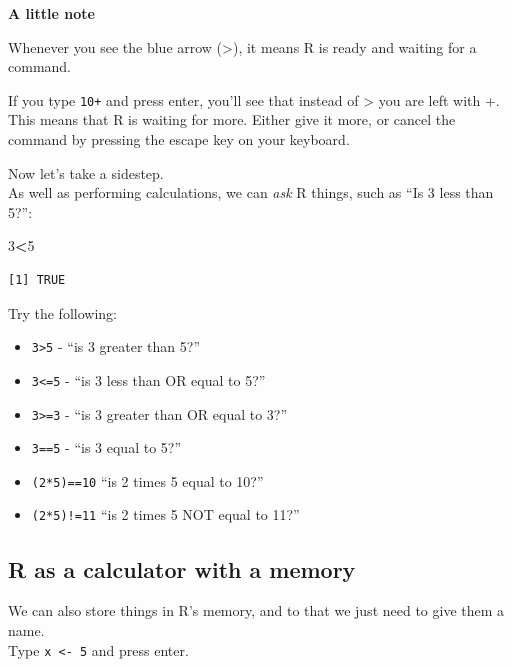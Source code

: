 \documentclass[]{book}
\newenvironment{Shaded}{\begin{snugshade}}{\end{snugshade}}
\newcommand{\DecValTok}[1]{\textcolor[rgb]{0.00,0.00,0.81}{#1}}
\newcommand{\OperatorTok}[1]{\textcolor[rgb]{0.81,0.36,0.00}{\textbf{#1}}}
\providecommand{\tightlist}{%
  \setlength{\itemsep}{0pt}\setlength{\parskip}{0pt}}
\begin{document}
\textbf{A little note}

Whenever you see the blue arrow ({\textgreater{}}), it means R is ready and waiting for a command.

If you type \texttt{10+} and press enter, you'll see that instead of {\textgreater{}} you are left with {+}. This means that R is waiting for more. Either give it more, or cancel the command by pressing the escape key on your keyboard.

Now let's take a sidestep.\\
As well as performing calculations, we can \emph{ask} R things, such as ``Is 3 less than 5?'':

\begin{Shaded}
\begin{Highlighting}[]
\DecValTok{3}\OperatorTok{<}\DecValTok{5}
\end{Highlighting}
\end{Shaded}

\begin{verbatim}
[1] TRUE
\end{verbatim}

Try the following:

\begin{itemize}
\tightlist
\item
  \texttt{3\textgreater{}5} - ``is 3 greater than 5?''
\item
  \texttt{3\textless{}=5} - ``is 3 less than OR equal to 5?''
\item
  \texttt{3\textgreater{}=3} - ``is 3 greater than OR equal to 3?''
\item
  \texttt{3==5} - ``is 3 equal to 5?''
\item
  \texttt{(2*5)==10} ``is 2 times 5 equal to 10?''
\item
  \texttt{(2*5)!=11} ``is 2 times 5 NOT equal to 11?''
\end{itemize}

\hypertarget{r-as-a-calculator-with-a-memory}{%
\subsection*{R as a calculator with a memory}\label{r-as-a-calculator-with-a-memory}}

We can also store things in R's memory, and to that we just need to give them a name.\\
Type \texttt{x\ \textless{}-\ 5} and press enter.
\end{document}
